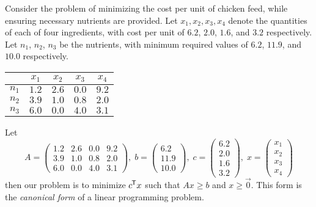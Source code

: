 \begin{exmp}
    Consider the problem of minimizing the cost per unit of chicken feed, while ensuring necessary nutrients are provided. Let $x_1, x_2, x_3, x_4$ denote the quantities of each of four ingredients, with cost per unit of $6.2$, $2.0$, $1.6$, and $3.2$ respectively. Let $n_1$, $n_2$, $n_3$ be the nutrients, with minimum required values of $6.2$, $11.9$, and $10.0$ respectively.

    \begin{minipage}{\linewidth}
        \begin{center}
        \label{exmp-feed-nutrition-values}
        \begin{tabular}{c|cccc}
        & $x_1$ & $x_2$ & $x_3$ & $x_4$\\
        \hline
        $n_1$ & $1.2$ & $2.6$ & $0.0$ & $9.2$ \\ \hline
        $n_2$ & $3.9$ & $1.0$ & $0.8$ & $2.0$ \\ \hline
        $n_3$ & $6.0$ & $0.0$ & $4.0$ & $3.1$ \\
        \end{tabular}
        \end{center}
    \end{minipage}

    Let
    \[A = \begin{pmatrix}
        1.2 & 2.6 & 0.0 & 9.2 \\
        3.9 & 1.0 & 0.8 & 2.0 \\
        6.0 & 0.0 & 4.0 & 3.1
    \end{pmatrix},\; b = \begin{pmatrix}
        6.2 \\ 11.9 \\ 10.0
    \end{pmatrix},\; c = \begin{pmatrix}
        6.2 \\ 2.0 \\ 1.6 \\ 3.2
    \end{pmatrix},\; x = \begin{pmatrix}
        x_1 \\ x_2 \\ x_3 \\ x_4
    \end{pmatrix}\]
    then our problem is to minimize ${c}^{\mkern-1.5mu\mathsf{T}}x$ such that $Ax \geq b$ and $x \geq \vec{0}$. This form is the \emph{canonical form} of a linear programming problem.
\end{exmp}

